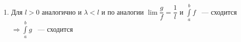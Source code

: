 \documentclass[../main.tex]{subfiles}
\begin{document}
\begin{enumerate}
\begin{itemize}
\begin{enumerate}
                                \item Для $l > 0$ аналогично и $\lambda < l$ и по аналогии $\lim \dfrac{g}{f} = \dfrac{1}{l}$ и $\int\limits^b_a f$ ~--- сходится $\Rightarrow \int\limits^b_a g$ ~--- сходится
                                
                            \end{enumerate}
                        
                    \end{itemize}
                
            \end{enumerate}
    

\newpage
\end{document}
